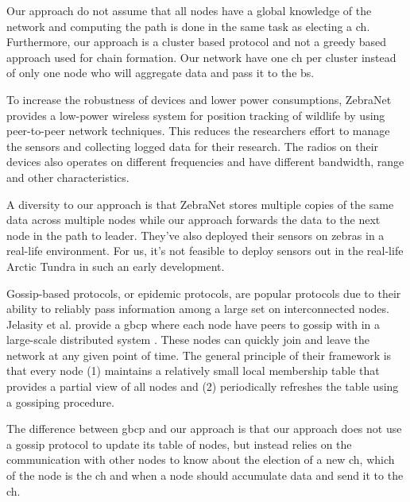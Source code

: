 \documentclass[USenglish]{uit-thesis}
\begin{document}
Our approach do not assume that all nodes have a global knowledge of the network and computing the path is done in the same task as electing a \gls{ch}. Furthermore, our approach is a cluster based protocol and not a greedy based approach used for chain formation. Our network have one \gls{ch} per cluster instead of only one node who will aggregate data and pass it to the \gls{bs}.


To increase the robustness of devices and lower power consumptions, ZebraNet \cite{zebranet} provides a low-power wireless system for position tracking of wildlife by using peer-to-peer network techniques. This reduces the researchers effort to manage the sensors and collecting logged data for their research. The radios on their devices also operates on different frequencies and have different bandwidth, range and other characteristics.

A diversity to our approach is that ZebraNet stores multiple copies of the same data across multiple nodes while our approach forwards the data to the next node in the path to leader. They've also deployed their sensors on zebras in a real-life environment. For us, it's not feasible to deploy sensors out in the real-life Arctic Tundra in such an early development.


Gossip-based protocols, or epidemic protocols, are popular protocols due to their ability to reliably pass information among a large set on interconnected nodes. Jelasity et al. \cite{gbsampling} provide a \gls{gbcp} where each node have peers to gossip with in a large-scale distributed system \cite{demers}. These nodes can quickly join and leave the network at any given point of time. The general principle of their framework is that every node (1) maintains a relatively small local membership table that provides a partial view of all nodes and (2) periodically refreshes the table using a gossiping procedure.

The difference between \gls{gbcp} and our approach is that our approach does not use a gossip protocol to update its table of nodes, but instead relies on the communication with other nodes to know about the election of a new \gls{ch}, which of the node is the \gls{ch} and when a node should accumulate data and send it to the \gls{ch}.


\end{document}
